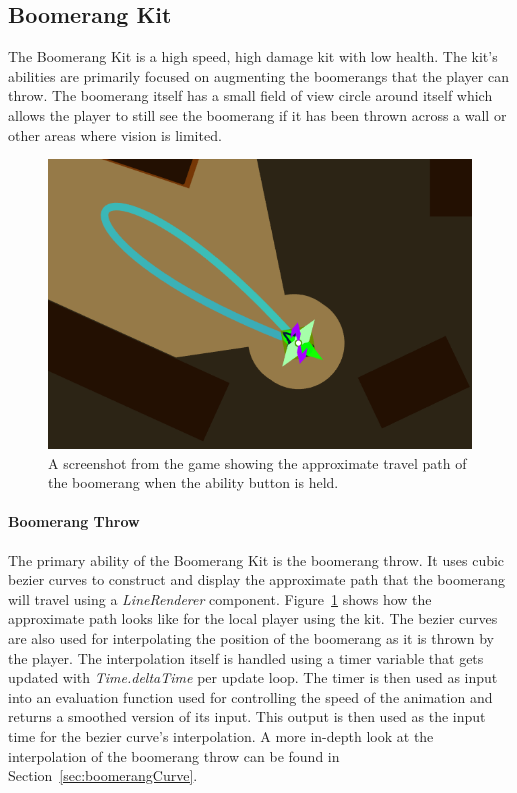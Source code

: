 \subsection{Boomerang Kit}
The Boomerang Kit is a high speed, high damage kit with low health. The kit's abilities are primarily focused on augmenting the boomerangs that the player can throw. The boomerang itself has a small field of view circle around itself which allows the player to still see the boomerang if it has been thrown across a wall or other areas where vision is limited. 

\begin{figure}[tbph]  %
  \centering
  \includegraphics[width=.75\textwidth]{images/boomerangKitLineRenderer}
  \caption[Approximate travel path of the boomerang]{A screenshot from the game showing the approximate travel path of the boomerang when the ability button is held.}
  \label{fig:boomerangLineRenderer}
\end{figure}

\paragraph{Boomerang Throw}
The primary ability of the Boomerang Kit is the boomerang throw. It uses cubic bezier curves to construct and display the approximate path that the boomerang will travel using a \emph{LineRenderer} component. Figure~\ref{fig:boomerangLineRenderer} shows how the approximate path looks like for the local player using the kit. 
The bezier curves are also used for interpolating the position of the boomerang as it is thrown by the player. The interpolation itself is handled using a timer variable that gets updated with \emph{Time.deltaTime} per update loop. The timer is then used as input into an evaluation function used for controlling the speed of the animation and returns a smoothed version of its input. This output is then used as the input time for the bezier curve's interpolation. A more in-depth look at the interpolation of the boomerang throw can be found in Section~\ref{sec:boomerangCurve}. 
    
